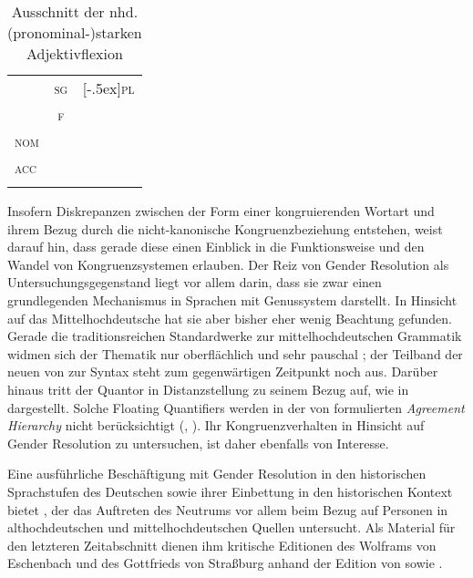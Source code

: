 \begin{table}
\centering
\caption%
	{Ausschnitt der nhd. (pronominal-)starken
	Adjektivflexion \autocites[vgl.][772]{woellstein2022}}
\begin{tabular}{l c c}
	\lsptoprule

		& \textsc{sg}
		& \mr{2}{*}[-.5ex]{\textsc{pl}}
	\\

	\cmidrule(lr){2-2}

		& \textsc{f}
		\\

	\midrule

	\textsc{nom}
		& \cellcolor{black!33}{-e}
		& \cellcolor{black!33}{-e}
		\\
	\textsc{acc}
		& \cellcolor{black!33}{-e}
		& \cellcolor{black!33}{-e}
		\\
	\lspbottomrule
\end{tabular}
\label{tab:nhd_stradj}
\end{table}

Insofern Diskrepanzen zwischen der Form einer kongruierenden Wortart und ihrem
Bezug durch die nicht-kanonische Kongruenzbeziehung entstehen, weist
\citet[144]{corbett2006} darauf hin, dass gerade diese einen Einblick in die
Funktionsweise und den Wandel von Kongruenz\-systemen erlauben. Der Reiz von
Gender Resolution als Untersuchungsgegenstand liegt vor allem darin, dass sie
zwar einen grundlegenden Mechanismus in Sprachen mit Genussystem darstellt. In
Hinsicht auf das Mittelhochdeutsche hat sie aber bisher
eher wenig Beachtung gefunden. Gerade die traditionsreichen Standard\-werke zur
mittelhochdeutschen Grammatik widmen sich der Thematik
nur oberflächlich und sehr pauschal \autocites(dazu
)[siehe][384]{paul2007}[188]{dal2014}; der
Teilband der neuen 
von \citeauthor*{ksw2} zur Syntax steht zum gegenwärtigen Zeitpunkt noch aus.
Darüber hinaus tritt der Quantor  in Distanzstellung zu seinem
Bezug auf, wie in  dargestellt. Solche Floating Quantifiers
\autocite{sportiche1988} werden in der von \citet[204]{corbett1979}
formulierten \textit{Agreement Hierarchy} nicht berücksichtigt
(, ). Ihr Kongruenzverhalten in
Hinsicht auf Gender Resolution zu untersuchen, ist daher ebenfalls von
Interesse.

Eine ausführliche Beschäftigung mit Gender Resolution in den historischen
Sprachstufen des Deutschen sowie ihrer Einbettung in den historischen Kontext
bietet \citet{askedal1973}, der das Auftreten des Neutrums vor allem beim Bezug
auf Personen in althochdeutschen und
mittelhochdeutschen Quellen untersucht. Als Material für
den letzteren Zeitabschnitt dienen ihm kritische Editionen des 
Wolframs von Eschenbach und des 
Gottfrieds von Straßburg anhand der Edition von
\citet{lachmannhartl1952} sowie \citet{maroldschroeder1969}.

